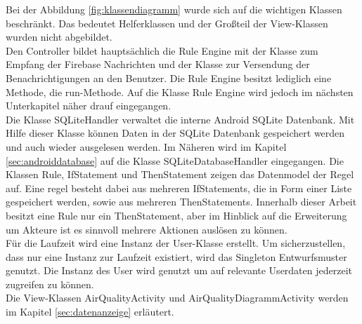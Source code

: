 Bei der Abbildung \ref{fig:klassendiagramm} wurde sich auf die wichtigen Klassen beschränkt. Das bedeutet Helferklassen und der Großteil der View-Klassen wurden nicht abgebildet.\\
Den Controller bildet hauptsächlich die Rule Engine mit der Klasse zum Empfang der Firebase Nachrichten und der Klasse zur Versendung der Benachrichtigungen an den Benutzer. Die Rule Engine besitzt lediglich eine Methode, die run-Methode. Auf die Klasse Rule Engine wird jedoch im nächsten Unterkapitel näher drauf eingegangen.\\
Die Klasse SQLiteHandler verwaltet die interne Android SQLite Datenbank. Mit Hilfe dieser Klasse können Daten in der SQLite Datenbank gespeichert werden und auch wieder ausgelesen werden. Im Näheren wird im Kapitel \ref{sec:androiddatabase} auf die Klasse SQLiteDatabaseHandler eingegangen. Die Klassen Rule, IfStatement und ThenStatement zeigen das Datenmodel der Regel auf. Eine regel besteht dabei aus mehreren IfStatements, die in Form einer Liste gespeichert werden, sowie aus mehreren ThenStatements. Innerhalb dieser Arbeit besitzt eine Rule nur ein ThenStatement, aber im Hinblick auf die Erweiterung um Akteure ist es sinnvoll mehrere Aktionen auslösen zu können.\\
Für die Laufzeit wird eine Instanz der User-Klasse erstellt. Um sicherzustellen, dass nur eine Instanz zur Laufzeit existiert, wird das Singleton Entwurfsmuster genutzt. Die Instanz des User wird genutzt um auf relevante Userdaten jederzeit zugreifen zu können.\\
Die View-Klassen AirQualityActivity und AirQualityDiagrammActivity werden im Kapitel \ref{sec:datenanzeige} erläutert.\\


